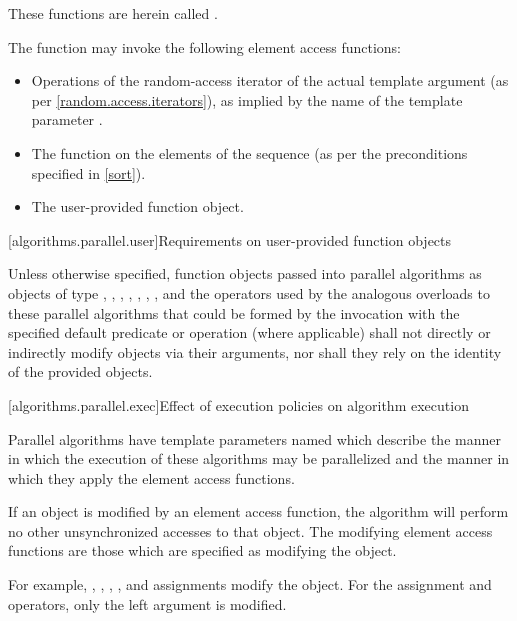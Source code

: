 These functions are herein called .
\begin{example}
The  function may invoke the following element access functions:

\begin{itemize}
\item
Operations of the random-access iterator of the actual template argument
(as per \ref{random.access.iterators}),
as implied by the name of the template parameter .

\item
The  function on the elements of the sequence (as per the
preconditions specified in \ref{sort}).

\item
The user-provided  function object.
\end{itemize}
\end{example}

[algorithms.parallel.user]{Requirements on user-provided function objects}

\pnum
Unless otherwise specified, function objects passed into parallel algorithms as
objects of type , , ,
, , ,
, and the operators used by the analogous overloads to
these parallel algorithms that could be formed by the invocation with the
specified default predicate or operation (where applicable) shall not directly
or indirectly modify objects via their arguments, nor shall they rely on the
identity of the provided objects.

[algorithms.parallel.exec]{Effect of execution policies on algorithm execution}

\pnum
Parallel algorithms have template parameters
named 
which describe the manner in which the execution of these algorithms may be
parallelized and the manner in which they apply the element access functions.

\pnum
If an object is modified by an element access function,
the algorithm will perform no other unsynchronized accesses to that object.
The modifying element access functions are those
which are specified as modifying the object.
\begin{note}
For example,
, \tcode{++}, \tcode{--}, , and assignments
modify the object.
For the assignment and  operators,
only the left argument is modified.
\end{note}

